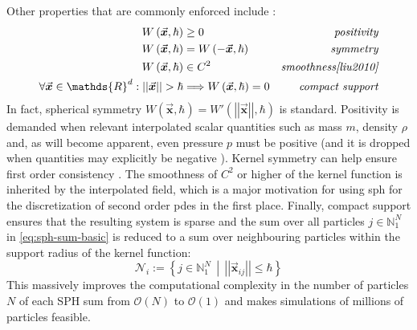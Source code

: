 \documentclass[conference]{IEEEtran}
\newcommand\abss[1]{\left|\left|#1\right|\right|}
\newcommand\vek[1]{\vec{\bm{#1}}}
\newcommand\br[1]{\left(#1\right)}
\begin{document}
Other properties that are commonly enforced include \cites{tutorial2019}{liu2010}:
\begin{equation}\label{eq:kernel-criteria}
  \begin{aligned}
    W\br{\vek{x}, \hbar} &\geq 0 & \textit{positivity}\\
    W\br{\vek{x}, \hbar} &= W\br{-\vek{x}, \hbar} & \textit{symmetry}\\
    W\br{\vek{x}, \hbar} &\in C^2 &\textit{smoothness\cite{liu2010}}\\
    \forall \vek{x}\in\mathds{R}^d: \abss{\vek{x}} > \hbar &\Longrightarrow W\br{\vek{x}, \hbar} = 0 & \textit{compact support}\\
  \end{aligned}
\end{equation}
In fact, spherical symmetry $W\br{\vek{x}, \hbar} = W'\br{\abss{\vek{x}}, \hbar}$ is standard. 
Positivity is demanded when relevant interpolated scalar quantities such as mass $m$, density $\rho$ and, as will become apparent, even pressure $p$ must be positive \cite{tutorial2019} (and it is dropped when quantities may explicitly be negative \cite{teschner-surf-tens-neg-kernel}). Kernel symmetry can help ensure first order consistency \cite{tutorial2019}. The smoothness of $C^2$ or higher of the kernel function is inherited by the interpolated field, which is a major motivation for using \ac{sph} for the discretization of second order \acs{pdes} in the first place. Finally, compact support ensures that the resulting system is sparse and the sum over all particles $j\in\mathds{N}_1^N$ in \autoref{eq:sph-sum-basic} is reduced to a sum over neighbouring particles within the support radius of the kernel function:
\begin{equation}\label{eq:neighbour-set-def}
  \mathcal{N}_i := \left\{ j\in\mathds{N}_1^N \, \middle| \, \abss{\vek{x}_{ij}} \leq \hbar \right\}
\end{equation}
This massively improves the computational complexity in the number of particles $N$ of each SPH sum from $\mathcal{O}\br{N}$ to $\mathcal{O}\br{1}$ and makes simulations of millions of particles feasible.
\end{document}
